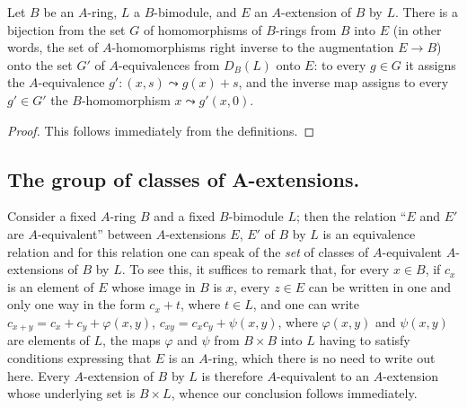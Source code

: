 \begin{proposition}[18.2.10]
\label{0.18.2.10}
Let $B$ be an $A$-ring, $L$ a $B$-bimodule, and $E$ an $A$-extension of $B$ by $L$.
There is a bijection from the set $G$ of homomorphisms of $B$-rings from $B$ into $E$ \textup{(in other words, the set of $A$-homomorphisms right inverse to the augmentation $E\to B$)} onto the set $G'$ of $A$-equivalences from $D_B(L)$ onto $E$: to every $g\in G$ it assigns the $A$-equivalence $g':(x,s)\leadsto g(x)+s$, and the inverse map assigns to every $g'\in G'$ the $B$-homomorphism $x\leadsto g'(x,0)$.
\end{proposition}

\begin{proof}
This follows immediately from the definitions.
\end{proof}

\subsection{The group of classes of A-extensions.}
\label{subsection:0.18.3}

\begin{env}[18.3.1]
\label{0.18.3.1}
Consider a fixed $A$-ring $B$ and a fixed $B$-bimodule $L$; then the relation ``$E$ and $E'$ are $A$-equivalent'' between $A$-extensions $E$, $E'$ of $B$ by $L$ is an equivalence relation and for this relation one can speak of the \emph{set} of classes of $A$-equivalent $A$-extensions of $B$ by $L$.
To see this, it suffices to remark that, for every $x\in B$, if $c_x$ is an element of $E$ whose image in $B$ is $x$, every $z\in E$ can be written in one and only one way in the form $c_x+t$, where $t\in L$, and one can write $c_{x+y}=c_x+c_y+\varphi(x,y)$, $c_{xy}=c_x c_y+\psi(x,y)$, where $\varphi(x,y)$ and $\psi(x,y)$ are elements of $L$, the maps $\varphi$ and $\psi$ from $B\times B$ into $L$ having to satisfy conditions expressing that $E$ is an $A$-ring, which there is no need to write out here.
Every $A$-extension of $B$ by $L$ is therefore $A$-equivalent to an $A$-extension whose underlying set is $B\times L$, whence our conclusion follows immediately.
\end{env}

